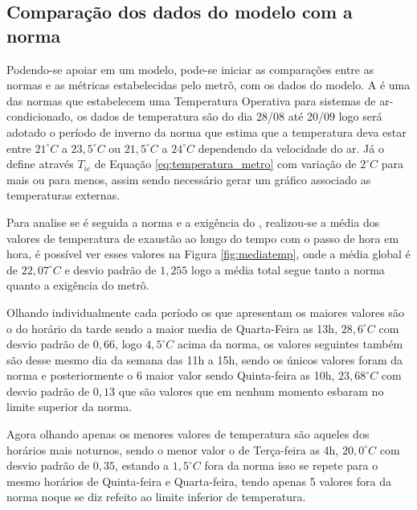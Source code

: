 \documentclass[acronym,symbols,table]{fei}
\begin{document}
\subsection{Comparação dos dados do modelo com a norma}

Podendo-se apoiar em um modelo, pode-se iniciar as comparações entre as normas e as métricas estabelecidas pelo metrô, com os dados do modelo. A \textcite{abnt216401} é uma das normas que estabelecem uma Temperatura Operativa para sistemas de ar-condicionado, os dados de temperatura são do dia 28/08 até 20/09 logo será adotado o período de inverno da norma que estima que a temperatura deva estar entre $21 ^\circ C$ a $23,5 ^\circ C$ ou $21,5 ^\circ C$ a $24 ^\circ C$ dependendo da velocidade do ar. Já o \textcite{metrosp2024} define através $T_{ic}$ de Equação \ref{eq:temperatura_metro} com variação de $2 ^\circ C$ para mais ou para menos, assim sendo necessário gerar um gráfico associado as temperaturas externas.

Para analise se é seguida a norma e a exigência do \textcite{metrosp2024}, realizou-se a média dos valores de temperatura de exaustão ao longo do tempo com o passo de hora em hora, é possível ver esses valores na Figura \ref{fig:mediatemp}, onde a média global é de $22,07 ^\circ C$ e desvio padrão de $1,255$ logo a média total segue tanto a norma quanto a exigência do metrô. 

Olhando individualmente cada período os que apresentam os maiores valores são o do horário da tarde sendo a maior media de Quarta-Feira as 13h, $28,6 ^\circ C$ com desvio padrão de $0,66$, logo $4,5 ^\circ C$ acima da norma, os valores seguintes também são desse mesmo dia da semana das 11h a 15h, sendo os únicos valores foram da norma e posteriormente o 6 maior valor sendo Quinta-feira  as 10h, $23,68^\circ C$ com desvio padrão de $0,13$ que são valores que em nenhum momento esbaram no limite superior da norma. 

Agora olhando apenas os menores valores de temperatura são aqueles dos horários mais noturnos, sendo o menor valor o de Terça-feira as 4h, $20,0 ^\circ C$ com desvio padrão de $0,35$, estando a $1,5 ^\circ C$ fora da norma isso se repete para o mesmo horários de Quinta-feira e Quarta-feira, tendo apenas 5 valores fora da norma noque se diz refeito ao limite inferior de temperatura. 
\end{document}
